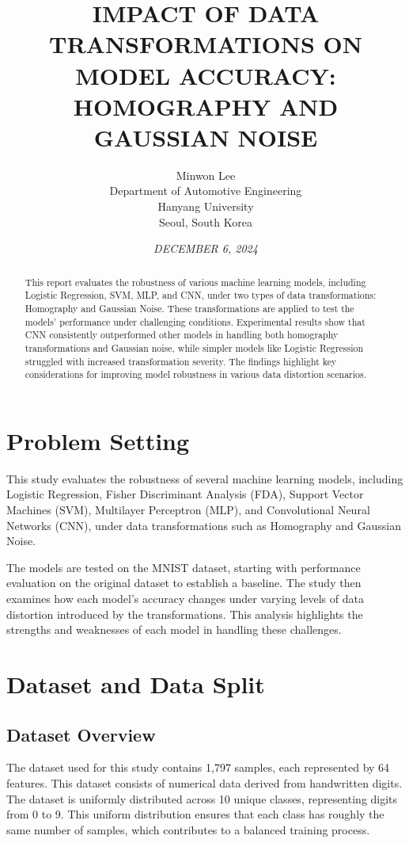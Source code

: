 \documentclass{article}
\title{\textbf{\MakeUppercase{Impact of Data Transformations on Model Accuracy:}\\ \MakeUppercase{Homography and Gaussian Noise}}}  %
\author{
    Minwon Lee \\  %
    Department of Automotive Engineering \\  %
    Hanyang University \\  %
    Seoul, South Korea  %
}
\date{\textit{\MakeUppercase{December 6, 2024}}}  %
\begin{document}
\maketitle  %

\begin{abstract}  
    This report evaluates the robustness of various machine learning models, 
    including Logistic Regression, SVM, MLP, and CNN, under two types of data transformations: Homography and Gaussian Noise. 
    These transformations are applied to test the models' performance under challenging conditions. 
    Experimental results show that CNN consistently outperformed other models in handling both homography transformations and Gaussian noise, while simpler models like Logistic Regression struggled with increased transformation severity. 
    The findings highlight key considerations for improving model robustness in various data distortion scenarios. 
\end{abstract}

\section{Problem Setting}
This study evaluates the robustness of several machine learning models, including Logistic Regression, Fisher Discriminant Analysis (FDA), Support Vector Machines (SVM), Multilayer Perceptron (MLP), and Convolutional Neural Networks (CNN), under data transformations such as Homography and Gaussian Noise. 

The models are tested on the MNIST dataset, starting with performance evaluation on the original dataset to establish a baseline. The study then examines how each model's accuracy changes under varying levels of data distortion introduced by the transformations. This analysis highlights the strengths and weaknesses of each model in handling these challenges.

\section{Dataset and Data Split}

\subsection{Dataset Overview}
The dataset used for this study contains 1,797 samples, each represented by 64 features. This dataset consists of numerical data derived from handwritten digits. The dataset is uniformly distributed across 10 unique classes, representing digits from 0 to 9. This uniform distribution ensures that each class has roughly the same number of samples, which contributes to a balanced training process.
\end{document}
